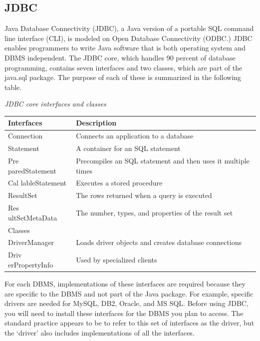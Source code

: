 \documentclass[
]{article}
\begin{document}
\hypertarget{jdbc}{%
\subsection*{JDBC}\label{jdbc}}

Java Database Connectivity (JDBC), a Java version of a portable SQL
command line interface (CLI), is modeled on Open Database Connectivity
(ODBC.) JDBC enables programmers to write Java software that is both
operating system and DBMS independent. The JDBC core, which handles 90
percent of database programming, contains seven interfaces and two
classes, which are part of the java.sql package. The purpose of each of
these is summarized in the following table.

\emph{JDBC core interfaces and classes}

\begin{longtable}[]{@{}
  >{\raggedright\arraybackslash}p{}
  >{\raggedright\arraybackslash}p{}@{}}
\toprule
Interfaces & Description \\
\midrule
\endhead
Connection & Connects an application to a database \\
Statement & A container for an SQL statement \\
Pre
paredStatement & Precompiles an SQL statement and then uses it
multiple times \\
Cal
lableStatement & Executes a stored procedure \\
ResultSet & The rows returned when a query is executed \\
Res
ultSetMetaData & The number, types, and properties of the result set \\
Classes & \\
DriverManager & Loads driver objects and creates database
connections \\
Driv
erPropertyInfo & Used by specialized clients \\
\bottomrule
\end{longtable}

For each DBMS, implementations of these interfaces are required because
they are specific to the DBMS and not part of the Java package. For
example, specific drivers are needed for MySQL, DB2, Oracle, and MS SQL.
Before using JDBC, you will need to install these interfaces for the
DBMS you plan to access. The standard practice appears to be to refer to
this set of interfaces as the driver, but the `driver' also includes
implementations of all the interfaces.
\end{document}
